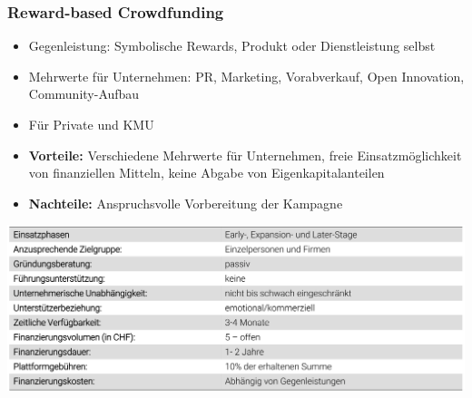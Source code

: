 \subsubsection{Reward-based Crowdfunding}
\begin{itemize}
	\item Gegenleistung: Symbolische Rewards, Produkt oder Dienstleistung selbst
	\item Mehrwerte für Unternehmen: PR, Marketing, Vorabverkauf, Open Innovation, Community-Aufbau
	\item Für Private und KMU
\end{itemize}
\begin{itemize}
	\item \textbf{Vorteile:} Verschiedene Mehrwerte für Unternehmen, freie Einsatzmöglichkeit von finanziellen Mitteln, keine Abgabe von Eigenkapitalanteilen
	\item \textbf{Nachteile:} Anspruchsvolle Vorbereitung der Kampagne
\end{itemize}
\includegraphics[width=1\linewidth]{images/crowdfunding}
